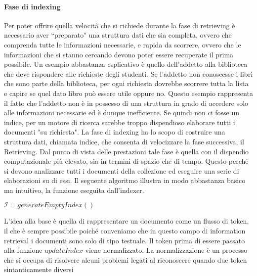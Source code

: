 \paragraph{Fase di indexing}
Per poter offrire quella velocità che si richiede durante la fase di retrieving è necessario aver ``preparato"
una struttura dati che sia completa, ovvero che comprenda tutte le informazioni necessarie, e 
rapida da scorrere, ovvero che le informazioni che si stanno cercando devono poter essere recuperate
il prima possibile.  Un esempio abbastanza esplicativo è quello dell'addetto alla biblioteca che deve rispondere
alle richieste degli studenti. Se l'addetto non conoscesse i libri che sono parte della biblioteca, per ogni richiesta
dovrebbe scorrere tutta la lista e capire se quel dato libro può essere utile oppure no.
Questo esempio rappresenta il fatto che l'addetto non è in possesso di una struttura in grado
di accedere solo alle informazioni necessarie ed è dunque inefficiente.
Se quindi non ci fosse un indice, per un motore di ricerca sarebbe troppo dispendioso elaborare tutti
i documenti "su richiesta".
La fase di indexing ha lo scopo di costruire una struttura dati, chiamata indice, che consenta
di velocizzare la fase successiva, il Retrieving.
Dal punto di vista delle prestazioni tale fase è quella con il  dispendio computazionale
più elevato, sia in termini di spazio che di tempo.
Questo perché si devono analizzare tutti i documenti della collezione ed eseguire una serie di elaborazioni
su di essi.
Il seguente algoritmo illustra in modo abbastanza basico ma intuitivo, la funzione eseguita dall'indexer.
\begin{algorithm}[h]
	\small
	\DontPrintSemicolon
	\BlankLine
	$\mathcal{I} = generateEmptyIndex()$\;
	\caption{\textsc{}}
	\label{alg:bray-curtis}
	
\end{algorithm}
L'idea alla base è quella di rappresentare un documento come un flusso di token, il che è sempre possibile
poiché conveniamo che in questo campo di information retrieval i documenti sono solo di tipo testuale.
Il token prima di essere passato alla funzione $updateIndex$ viene normalizzato. La normalizzazione è un processo
che si occupa di risolvere alcuni problemi legati al riconoscere quando due token sintanticamente diversi
